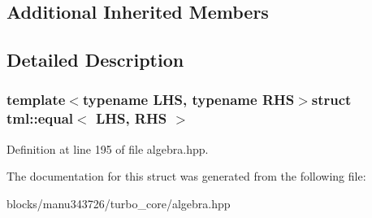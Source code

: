 \subsection*{Additional Inherited Members}


\subsection{Detailed Description}
\subsubsection*{template$<$typename L\+H\+S, typename R\+H\+S$>$struct tml\+::equal$<$ L\+H\+S, R\+H\+S $>$}



Definition at line 195 of file algebra.\+hpp.



The documentation for this struct was generated from the following file\+:\begin{DoxyCompactItemize}
\item 
blocks/manu343726/turbo\+\_\+core/algebra.\+hpp\end{DoxyCompactItemize}
